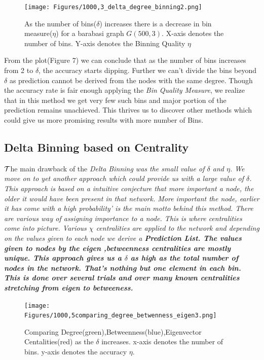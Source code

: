 \documentclass{article}
\begin{document}
\begin{figure}[htp]
\centering
\texttt{[image: Figures/1000,3\_delta\_degree\_binning2.png]}
\caption{As the number of bins($\delta$) increases there is a decrease in bin measure($\eta$) for a barabasi graph $G(500,3)$. X-axis denotes the number of bins. Y-axis denotes the Binning Quality $\eta$}
\label{X axis : Number Of Bins , Y axis : Bin Measure}
\end{figure}

\rm From the plot(Figure 7) we can conclude that as the number of bins increases from 2 to $\delta$, the accuracy starts dipping. Further we can’t divide the bins beyond $\delta$ as prediction cannot be derived from the nodes with the same degree. Though the accuracy rate is fair enough applying the \emph{Bin Quality Measure}, we realize that in this method we get very few such bins and major portion of the prediction remains unachieved. This thrives us to discover other methods which could give us more promising results with more number of Bins.

\subsection{Delta Binning based on Centrality}
\hspace{.2in}$\cal T$he main drawback of the \it Delta Binning \rm was the small value of $\delta$ and $\eta$. We move on to yet another approach which could provide us with a large value of $\delta$. This approach is based on a intuitive conjecture that more important a node, the older it would have been present in that network. More important the node, earlier it has come with a high probability’ is the main motto behind this method.
There are various way of assigning importance to a node. This is where centralities come into picture. Various $\chi$ centralities are applied to the network and depending on the values given to each node we derive a \bf \emph{Prediction List}\rm.
The values given to nodes by the eigen ,betweenness centralities are mostly unique. This approach gives us a $\delta$ as high as the total number of nodes in the network. That’s nothing but one element in each bin. This is done over several trials and over many known centralities stretching from eigen to betweeness.

\begin{figure}[htp]
\centering
\texttt{[image: Figures/1000,5comparing\_degree\_betwenness\_eigen3.png]}
\caption{Comparing Degree(green),Betweenness(blue),Eigenvector Centalities(red) as the $\delta$ increases. x-axis denotes the number of bins. y-axis denotes the accuracy $\eta$.}
\label{}
\end{figure}
\end{document}
